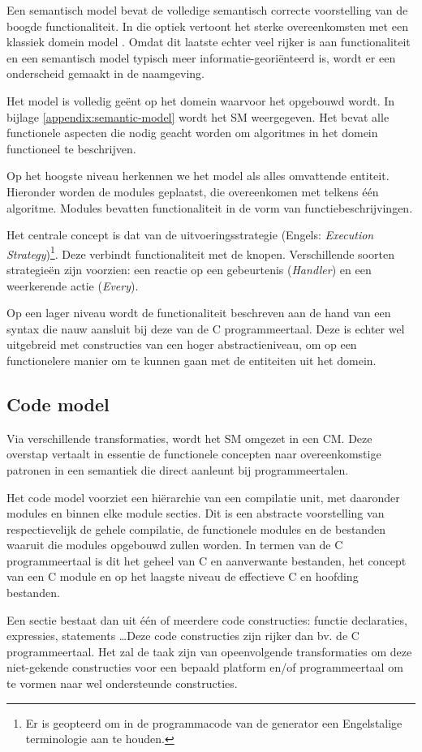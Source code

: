 Een semantisch model bevat de volledige semantisch correcte voorstelling van de
boogde functionaliteit. In die optiek vertoont het sterke overeenkomsten met
een klassiek domein model \citep{fowler2010domain}. Omdat dit laatste echter
veel rijker is aan functionaliteit en een semantisch model typisch meer
informatie-geori\"enteerd is, wordt er een onderscheid gemaakt in de naamgeving.

Het model is volledig ge\"ent op het domein waarvoor het opgebouwd wordt. In
bijlage \ref{appendix:semantic-model} wordt het SM weergegeven. Het bevat alle
functionele aspecten die nodig geacht worden om algoritmes in het domein
functioneel te beschrijven.

Op het hoogste niveau herkennen we het model als alles omvattende entiteit.
Hieronder worden de modules geplaatst, die overeenkomen met telkens \'e\'en
algoritme. Modules bevatten functionaliteit in de vorm van
functiebeschrijvingen.

Het centrale concept is dat van de uitvoeringsstrategie (Engels:
\emph{Execution Strategy})\footnote{Er is geopteerd om in de programmacode van
de generator een Engelstalige terminologie aan te houden.}. Deze verbindt
functionaliteit met de knopen. Verschillende soorten strategie\"en zijn
voorzien: een reactie op een gebeurtenis (\emph{Handler}) en een weerkerende
actie (\emph{Every}).

Op een lager niveau wordt de functionaliteit beschreven aan de hand van een
syntax die nauw aansluit bij deze van de C programmeertaal. Deze is echter wel
uitgebreid met constructies van een hoger abstractieniveau, om op een
functionelere manier om te kunnen gaan met de entiteiten uit het domein.

\subsection{Code model}
\label{subsection:arch-code-model}

Via verschillende transformaties, wordt het SM omgezet in een CM. Deze overstap
vertaalt in essentie de functionele concepten naar overeenkomstige patronen in
een semantiek die direct aanleunt bij programmeertalen.

Het code model voorziet een hi\"erarchie van een compilatie unit, met daaronder
modules en binnen elke module secties. Dit is een abstracte voorstelling van
respectievelijk de gehele compilatie, de functionele modules en de bestanden
waaruit die modules opgebouwd zullen worden. In termen van de C programmeertaal
is dit het geheel van C en aanverwante bestanden, het concept van een C module
en op het laagste niveau de effectieve C en hoofding bestanden.

Een sectie bestaat dan uit \'e\'en of meerdere code constructies: functie
declaraties, expressies, statements \dots Deze code constructies zijn rijker
dan bv. de C programmeertaal. Het zal de taak zijn van opeenvolgende
transformaties om deze niet-gekende constructies voor een bepaald platform
en/of programmeertaal om te vormen naar wel ondersteunde constructies.

